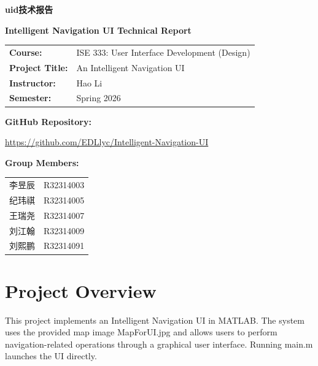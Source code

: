 \documentclass[12pt,a4paper]{ctexart}
\begin{document}
\begin{titlepage}
  \centering
  \vspace*{2.5cm}
  {\bfseries uid技术报告\par}
  \vspace{1cm}
  {\bfseries Intelligent Navigation UI Technical Report\par}
  \vspace{2.2cm}

  \renewcommand{\arraystretch}{1.45}
  \begin{tabular}{>{\bfseries}p{4cm}p{8cm}}
    Course: & ISE 333: User Interface Development (Design) \\
    Project Title: & An Intelligent Navigation UI \\
    Instructor: & Hao Li \\
    Semester: & Spring 2026 \\
  \end{tabular}

  \vspace{0.9cm}
  {\bfseries GitHub Repository: }{\url{https://github.com/EDLlyc/Intelligent-Navigation-UI}\par}

  \vspace{1.8cm}

  {\bfseries Group Members: \par}
  \vspace{0.7cm}

  \begin{tabular}{p{6cm}p{4cm}}
    李昱辰 & R32314003 \\
    纪玮祺 & R32314005 \\
    王瑞尧 & R32314007 \\
    刘江翰 & R32314009 \\
    刘熙鹏 & R32314091 \\
  \end{tabular}

  \vfill
\end{titlepage}

\tableofcontents
\clearpage

\section{Project Overview}

This project implements an Intelligent Navigation UI in MATLAB. The system uses the provided map image MapForUI.jpg and allows users to perform navigation-related operations through a graphical user interface. Running main.m launches the UI directly.
\end{document}
